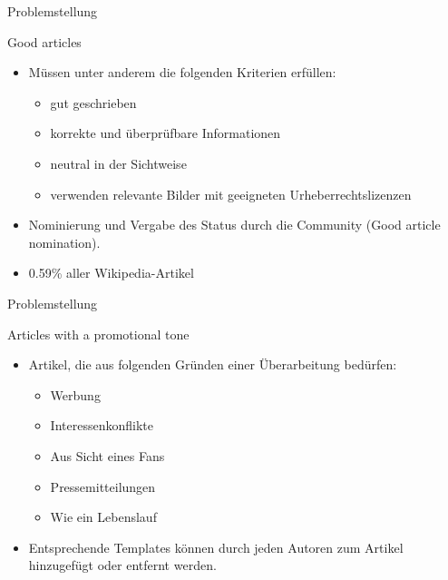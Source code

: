\documentclass[aspectratio=169]{beamer} %
\begin{document}
\begin{frame}{Problemstellung}
    \begin{block}{Good articles}
        \begin{itemize}
            \item Müssen unter anderem die folgenden Kriterien erfüllen:
                  \begin{itemize}
                      \item gut geschrieben
                      \item korrekte und überprüfbare Informationen
                      \item neutral in der Sichtweise
                      \item verwenden relevante Bilder mit geeigneten Urheberrechtslizenzen
                  \end{itemize}
            \item Nominierung und Vergabe des Status durch die Community (Good article nomination).
            \item 0.59\% aller Wikipedia-Artikel
        \end{itemize}
    \end{block}
\end{frame}

\begin{frame}{Problemstellung}
    \begin{block}{Articles with a promotional tone}
        \begin{itemize}
            \item Artikel, die aus folgenden Gründen einer Überarbeitung bedürfen:
                  \begin{itemize}
                      \item Werbung
                      \item Interessenkonflikte
                      \item Aus Sicht eines Fans
                      \item Pressemitteilungen
                      \item Wie ein Lebenslauf
                  \end{itemize}
            \item Entsprechende Templates können durch jeden Autoren zum Artikel hinzugefügt oder entfernt werden.
        \end{itemize}
    \end{block}
\end{frame}
\end{document}
